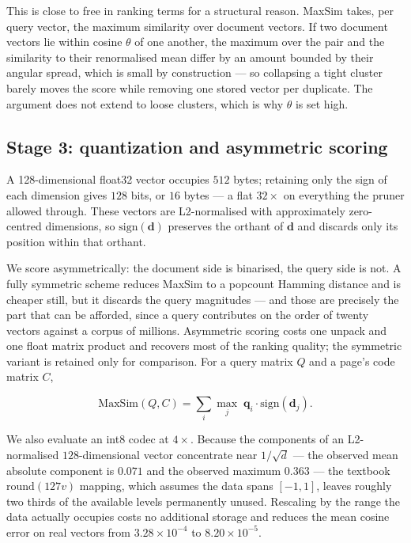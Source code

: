 \documentclass[conference]{IEEEtran}
\begin{document}
This is close to free in ranking terms for a structural reason. MaxSim takes, per
query vector, the maximum similarity over document vectors. If two document
vectors lie within cosine $\theta$ of one another, the maximum over the pair and
the similarity to their renormalised mean differ by an amount bounded by their
angular spread, which is small by construction --- so collapsing a tight cluster
barely moves the score while removing one stored vector per duplicate. The
argument does not extend to loose clusters, which is why $\theta$ is set high.

\subsection{Stage 3: quantization and asymmetric scoring}
A 128-dimensional float32 vector occupies $512$ bytes; retaining only the sign of
each dimension gives $128$ bits, or $16$ bytes --- a flat $32\times$ on everything
the pruner allowed through. These vectors are L2-normalised with approximately
zero-centred dimensions, so $\mathrm{sign}(\mathbf{d})$ preserves the orthant of
$\mathbf{d}$ and discards only its position within that orthant.

We score asymmetrically: the document side is binarised, the query side is not.
A fully symmetric scheme reduces MaxSim to a popcount Hamming distance and is
cheaper still, but it discards the query magnitudes --- and those are precisely the
part that can be afforded, since a query contributes on the order of twenty
vectors against a corpus of millions. Asymmetric scoring costs one unpack and one
float matrix product and recovers most of the ranking quality; the symmetric
variant is retained only for comparison. For a query matrix $Q$ and a page's code
matrix $C$,

\begin{equation}
\mathrm{MaxSim}(Q, C) = \sum_{i} \max_{j} \; \mathbf{q}_i \cdot \mathrm{sign}(\mathbf{d}_j).
\end{equation}

We also evaluate an int8 codec at $4\times$. Because the components of an
L2-normalised $128$-dimensional vector concentrate near $1/\sqrt{d}$ --- the
observed mean absolute component is $0.071$ and the observed maximum $0.363$ ---
the textbook $\mathrm{round}(127v)$ mapping, which assumes the data spans
$[-1,1]$, leaves roughly two thirds of the available levels permanently unused.
Rescaling by the range the data actually occupies costs no additional storage and
reduces the mean cosine error on real vectors from $3.28 \times 10^{-4}$ to
$8.20 \times 10^{-5}$.
\end{document}
